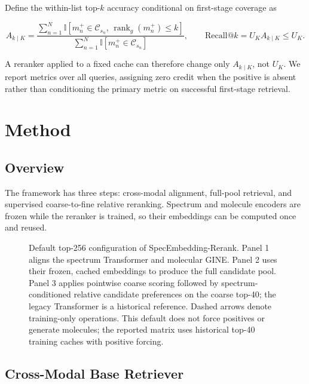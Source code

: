 \documentclass[runningheads]{llncs}
\newcommand{\method}{SpecEmbedding-Rerank}
\newcommand{\candidates}{\mathcal{C}}
\begin{document}
Define the within-list top-$k$ accuracy conditional on first-stage coverage as

\begin{equation}
  A_{k\mid K} =
  \frac{\sum_{n=1}^{N}
  \mathbb{I}[m_n^+\in\candidates_{s_n},\,
  \operatorname{rank}_g(m_n^+)\le k]}
  {\sum_{n=1}^{N}\mathbb{I}[m_n^+\in\candidates_{s_n}]},
  \qquad
  \mathrm{Recall@}k=U_K A_{k\mid K}\le U_K.
  \label{eq:coverage_decomposition}
\end{equation}

A reranker applied to a fixed cache can therefore change only
$A_{k\mid K}$, not $U_K$. We report metrics over all queries, assigning zero
credit when the positive is absent rather than conditioning the primary metric
on successful first-stage retrieval.

\section{Method}

\subsection{Overview}

The framework has three steps: cross-modal alignment, full-pool retrieval, and
supervised coarse-to-fine relative reranking. Spectrum and molecule encoders are
frozen while the reranker is trained, so their embeddings can be computed once
and reused.

\begin{figure}[t]
  \centering
  
  \caption{Default top-256 configuration of \method{}. Panel 1 aligns the spectrum Transformer and
  molecular GINE\@. Panel 2 uses their frozen, cached embeddings to produce the
  full candidate pool. Panel 3 applies pointwise coarse scoring followed by
  spectrum-conditioned relative candidate preferences on the coarse top-40;
  the legacy Transformer is a historical reference. Dashed arrows denote
  training-only operations. This default does not force positives or generate
  molecules; the reported matrix uses historical top-40 training caches with
  positive forcing.}
  \label{fig:overview}
\end{figure}

\subsection{Cross-Modal Base Retriever}
\end{document}
